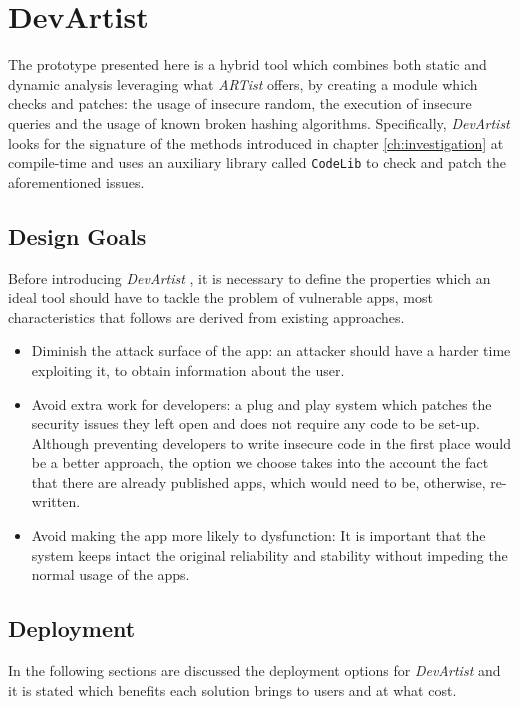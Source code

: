 \chapter{DevArtist}
\label{ch:devartist}
The prototype presented here is a hybrid tool which combines both static and dynamic analysis leveraging what \emph{ARTist} offers, by creating a module which checks and patches: the usage of insecure random, the execution of insecure queries and the usage of known broken hashing algorithms. Specifically, \emph{DevArtist} looks for the signature of the methods introduced in chapter \ref{ch:investigation} at compile-time and uses an auxiliary library called \texttt{CodeLib} to check and patch the aforementioned issues.

\section{Design Goals}
Before introducing \emph{DevArtist} , it is necessary to define the properties which an ideal tool should have to tackle the problem of vulnerable apps, most characteristics that follows are derived from existing approaches.
\begin{itemize}
	\item{Diminish the attack surface of the app: an attacker should have a harder time exploiting it, to obtain information about the user.}
	\item{Avoid extra work for developers: a plug and play system which patches the security issues they left open and does not require any code to be set-up. Although preventing developers to write insecure code in the first place would be a better approach, the option we choose takes into the account the fact that there are already published apps, which would need to be, otherwise, re-written.}
	\item{Avoid making the app more likely to dysfunction: It is important that the system keeps intact the original reliability and stability without impeding the normal usage of the apps.}
\end{itemize}

\section{Deployment}
In the following sections are discussed the deployment options for \emph{DevArtist} and it is stated which benefits each solution brings to users and at what cost. 

